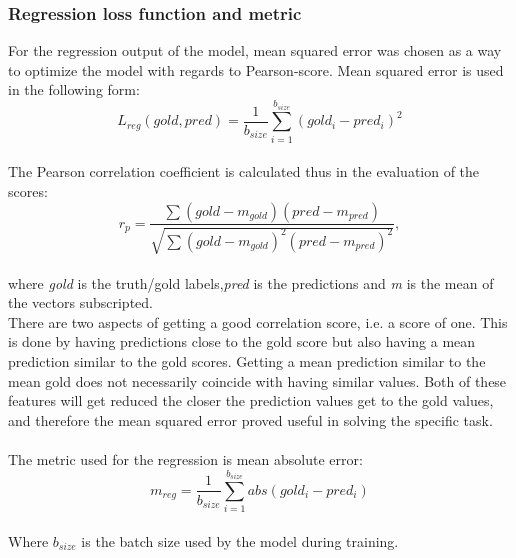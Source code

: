 \subsubsection{Regression loss function and metric}
For the regression output of the model, mean squared error was chosen as a way to optimize the model with regards to Pearson-score. Mean squared error is used in the following form:\\
\begin{equation} \label{eq:lreg}
L_{reg}(gold, pred)=\dfrac{1}{b_{size}}\sum^{b_{size}}_{i=1}\left(gold_{i}-pred_{i}\right)^{2}
\end{equation}\\
The Pearson correlation coefficient is calculated thus in the evaluation of the scores:\\
\begin{equation} \label{eq:pearson}
r_{p} = \dfrac{\sum \left(gold-m_{gold}\right) \left(pred-m_{pred}\right)}{\sqrt{\sum \left(gold-m_{gold}\right)^{2} \left(pred-m_{pred}\right)^{2}}},
\end{equation}\\
where \textit{gold} is the truth/gold labels,\textit{pred} is the predictions and \textit{m} is the mean of the vectors subscripted.\\
There are two aspects of getting a good correlation score, i.e. a score of one. This is done by having predictions close to the gold score but also having a mean prediction similar to the gold scores. Getting a mean prediction similar to the mean gold does not necessarily coincide with having similar values. Both of these features will get reduced the closer the prediction values get to the gold values, and therefore the mean squared error proved useful in solving the specific task.\\
\\
The metric used for the regression is mean absolute error:\\
\begin{equation} \label{eq:meanabs}
m_{reg}=\dfrac{1}{b_{size}}\sum^{b_{size}}_{i=1}abs\left(gold_{i}-pred_{i}\right)
\end{equation}\\
Where $b_{size}$ is the batch size used by the model during training. 

